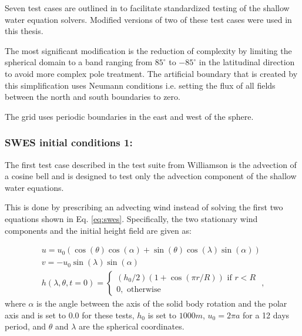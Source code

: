 Seven test cases are outlined in \citet{williamson1992standard} to facilitate standardized testing of the shallow water equation solvers.
Modified versions of two of these test cases were used in this thesis.

The most significant modification is the reduction of complexity by limiting the spherical domain to a band ranging from $85^\circ$ to $-85^\circ$ in the latitudinal direction to avoid more complex pole treatment.
The artificial boundary that is created by this simplification uses Neumann conditions i.e. setting the flux of all fields between the north and south boundaries to zero.

The grid uses periodic boundaries in the east and west of the sphere.

\subsubsection{SWES initial conditions 1:}
The first test case described in the test suite from Williamson is the advection of a cosine bell and is designed to test only the advection component of the shallow water equations.

This is done by prescribing an advecting wind instead of solving the first two equations shown in Eq. \ref{eq:swes}.
Specifically, the two stationary wind components and the initial height field are given as:

\begin{equation}
\label{eq:swes_ic0}
\begin{split}
u = u_0 \left( \cos \left( \theta \right) \cos \left( \alpha \right) + \sin \left( \theta \right) \cos \left( \lambda \right) \sin \left( \alpha \right) \right)
\\
v = -u_0 \sin \left( \lambda \right) \sin \left( \alpha \right)
\\
h \left( \lambda, \theta, t=0 \right) =  \begin{cases}
\left(h_0 / 2 \right) \left( 1 + \cos \left( \pi r / R \right) \right) \text{ if } r < R \\
0, \text{ otherwise}
\end{cases}
\text{ ,}
\end{split}
\end{equation}
where $\alpha$ is the angle between the axis of the solid body rotation and the polar axis and is set to $0.0$ for these tests, $h_0$ is set to $1000 m$, $u_0 = 2 \pi a$ for a 12 days period, and $\theta$ and $\lambda$ are the spherical coordinates.

